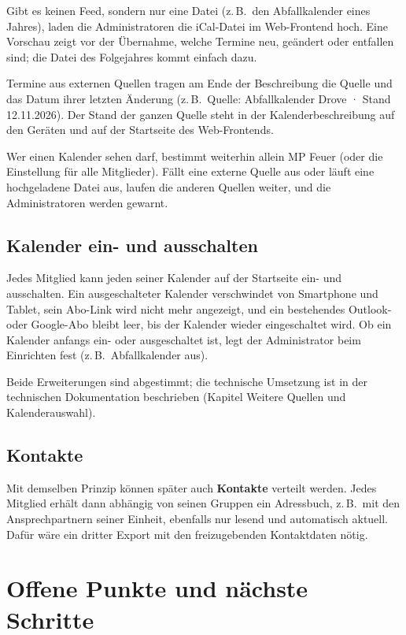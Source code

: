 \documentclass[a4paper,fontsize=10pt]{scrartcl}
\begin{document}
Gibt es keinen Feed, sondern nur eine Datei (z.\,B.\ den Abfallkalender
eines Jahres), laden die Administratoren die iCal-Datei im Web-Frontend hoch.
Eine Vorschau zeigt vor der Übernahme, welche Termine neu, geändert oder
entfallen sind; die Datei des Folgejahres kommt einfach dazu.

Termine aus externen Quellen tragen am Ende der Beschreibung die Quelle und
das Datum ihrer letzten Änderung (z.\,B.\ \glqq Quelle: Abfallkalender
Drove · Stand 12.11.2026\grqq). Der Stand der ganzen Quelle steht in der
Kalenderbeschreibung auf den Geräten und auf der Startseite des
Web-Frontends.

Wer einen Kalender sehen darf, bestimmt weiterhin allein MP Feuer (oder die
Einstellung \glqq für alle Mitglieder\grqq). Fällt eine externe Quelle aus
oder läuft eine hochgeladene Datei aus, laufen die anderen Quellen weiter,
und die Administratoren werden gewarnt.

\subsection*{Kalender ein- und ausschalten}

Jedes Mitglied kann jeden seiner Kalender auf der Startseite ein- und
ausschalten. Ein ausgeschalteter Kalender verschwindet von Smartphone und
Tablet, sein Abo-Link wird nicht mehr angezeigt, und ein bestehendes
Outlook- oder Google-Abo bleibt leer, bis der Kalender wieder eingeschaltet
wird. Ob ein Kalender anfangs ein- oder ausgeschaltet ist, legt der
Administrator beim Einrichten fest (z.\,B.\ Abfallkalender aus).

Beide Erweiterungen sind abgestimmt; die technische Umsetzung ist in der
technischen Dokumentation beschrieben (Kapitel \glqq Weitere Quellen und
Kalenderauswahl\grqq).

\subsection*{Kontakte}

Mit demselben Prinzip können später auch \textbf{Kontakte} verteilt werden.
Jedes Mitglied erhält dann abhängig von seinen Gruppen ein Adressbuch, z.\,B.\
mit den Ansprechpartnern seiner Einheit, ebenfalls nur lesend und automatisch
aktuell. Dafür wäre ein dritter Export mit den freizugebenden Kontaktdaten
nötig.

\section{Offene Punkte und nächste Schritte}
\end{document}
